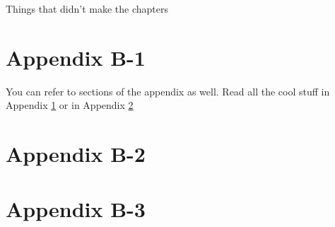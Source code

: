 Things that didn't make the chapters

\section{Appendix B-1}\label{app:B-1}

You can refer to sections of the appendix as well. Read all the cool stuff in Appendix \ref{app:B-1} or in Appendix \ref{app:B-2}

\section{Appendix B-2}\label{app:B-2}

\section{Appendix B-3}\label{app:B-3}

\clearpage
